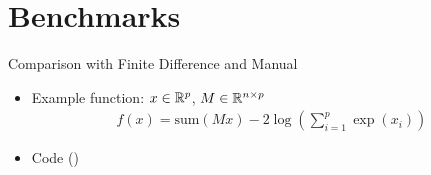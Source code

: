 \section{Benchmarks}
\frame{\tableofcontents[currentsection]}

\begin{frame}{Comparison with Finite Difference and Manual}
\begin{itemize}
    \item Example function: 
    $x \in \mathbb{R}^p$, $M \in \mathbb{R}^{n\times p}$
    \begin{align*}
        f(x) = \text{sum}(Mx) - 2\log(\sum\limits_{i=1}^p \exp{(x_i)})
    \end{align*}
    \item Code (\href{https://github.com/JamesYang007/FastAD-Report/blob/master/slides/stanford-01272022/examples/src/compare_fd.cpp}{})
\end{itemize} 
\begin{table}[t]
    \centering
\end{table}
\end{frame}
